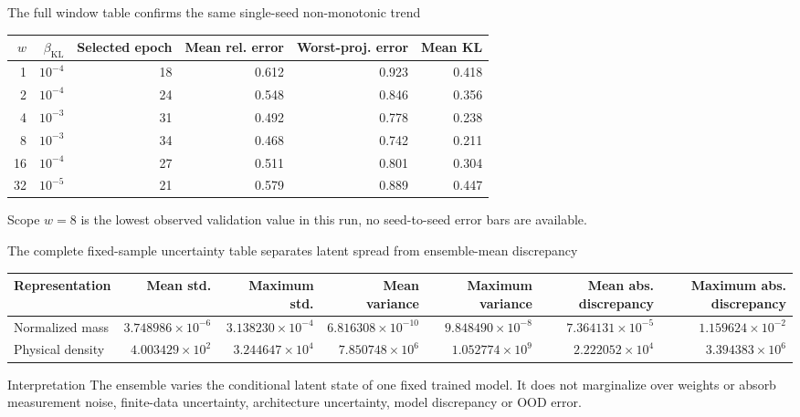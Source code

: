 \begin{frame}[t,shrink=5]{The full window table confirms the same single-seed non-monotonic trend}
\begin{center}\begin{adjustbox}{max width=\linewidth}
\begin{tabular}{rrrrrr}\toprule
$w$ & $\beta_{\mathrm{KL}}$ & Selected epoch & Mean rel. error & Worst-proj. error & Mean KL\\\midrule
1 & $10^{-4}$ & 18 & 0.612 & 0.923 & 0.418\\
2 & $10^{-4}$ & 24 & 0.548 & 0.846 & 0.356\\
4 & $10^{-3}$ & 31 & 0.492 & 0.778 & 0.238\\
8 & $10^{-3}$ & 34 & 0.468 & 0.742 & 0.211\\
16 & $10^{-4}$ & 27 & 0.511 & 0.801 & 0.304\\
32 & $10^{-5}$ & 21 & 0.579 & 0.889 & 0.447\\\bottomrule\end{tabular}
\end{adjustbox}\end{center}\begin{block}{Scope}
$w=8$ is the lowest observed validation value in this run, no seed-to-seed error bars are available.
\end{block}

\end{frame}

\begin{frame}[t,shrink=5]{The complete fixed-sample uncertainty table separates latent spread from ensemble-mean discrepancy}
\begin{center}\begin{adjustbox}{max width=\linewidth}
\begin{tabular}{lrrrrrr}\toprule
Representation & Mean std. & Maximum std. & Mean variance & Maximum variance & Mean abs. discrepancy & Maximum abs. discrepancy\\\midrule
Normalized mass & $3.748986\times10^{-6}$ & $3.138230\times10^{-4}$ & $6.816308\times10^{-10}$ & $9.848490\times10^{-8}$ & $7.364131\times10^{-5}$ & $1.159624\times10^{-2}$\\
Physical density & $4.003429\times10^2$ & $3.244647\times10^4$ & $7.850748\times10^6$ & $1.052774\times10^9$ & $2.222052\times10^4$ & $3.394383\times10^6$\\\bottomrule\end{tabular}
\end{adjustbox}\end{center}\begin{block}{Interpretation}
The ensemble varies the conditional latent state of one fixed trained model. It does not marginalize over weights or absorb measurement noise, finite-data uncertainty, architecture uncertainty, model discrepancy or OOD error.
\end{block}

\end{frame}

